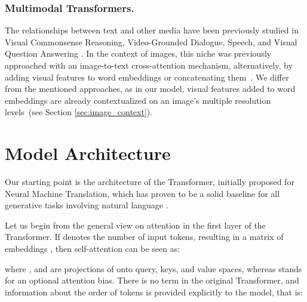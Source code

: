 \documentclass[runningheads]{llncs}
\begin{document}
\subsubsection{Multimodal Transformers.}
The relationships between text and other media have been previously studied in Visual Commonsense Reasoning, Video-Grounded Dialogue, Speech, and Visual Question Answering \cite{han2021survey,le-etal-2019-multimodal,DBLP:journals/corr/abs-1910-11559}. In the context of images, this niche was previously approached with an image-to-text cross-attention mechanism, alternatively, by adding visual features to word embeddings or concatenating them~\cite{9037732,lee2018stacked,li2019visualbert,Su2020VL-BERT,xu2020layoutlm}. 
We differ from the mentioned approaches, as in our model, visual features added to word embeddings are already contextualized on an image's multiple resolution levels~(see Section \ref{sec:image_context}). 


\section{Model Architecture}\label{sec:arch}
Our starting point is the architecture of the Transformer, initially proposed for Neural Machine Translation, which has proven to be a solid baseline for all generative tasks involving natural language \cite{transformer}.

Let us begin from the general view on attention in the first layer of the Transformer.
If  denotes the number of input tokens, resulting in a matrix of embeddings , then self-attention can be seen as:

\noindent where ,  and  are projections of  onto query, keys, and value spaces, whereas  stands for an optional attention bias.
There is no  term in the original Transformer, and information about the order of tokens is provided explicitly to the model, that is:
\end{document}
